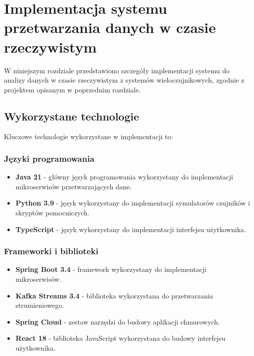 \section{Implementacja systemu przetwarzania danych w czasie rzeczywistym}
\label{sec:implementacja_systemu}

W niniejszym rozdziale przedstawiono szczegóły implementacji systemu do analizy danych w czasie rzeczywistym z systemów wieloczujnikowych,
zgodnie z projektem opisanym w poprzednim rozdziale.

\subsection{Wykorzystane technologie}
\label{subsec:technologie}

Kluczowe technologie wykorzystane w implementacji to:

\subsubsection{Języki programowania}
\label{subsubsec:jezyki_programowania}

\begin{itemize}
    \item \textbf{Java 21} - główny język programowania wykorzystany do implementacji mikroserwisów przetwarzających dane.
    \item \textbf{Python 3.9} - język wykorzystany do implementacji symulatorów czujników i skryptów pomocniczych.
    \item \textbf{TypeScript} - język wykorzystany do implementacji interfejsu użytkownika.
\end{itemize}

\subsubsection{Frameworki i biblioteki}
\label{subsubsec:frameworki}

\begin{itemize}
    \item \textbf{Spring Boot 3.4} - framework wykorzystany do implementacji mikroserwisów.
    \item \textbf{Kafka Streams 3.4} - biblioteka wykorzystana do przetwarzania strumieniowego.
    \item \textbf{Spring Cloud} - zestaw narzędzi do budowy aplikacji chmurowych.
    \item \textbf{React 18} - biblioteka JavaScript wykorzystana do budowy interfejsu użytkownika.
\end{itemize}

